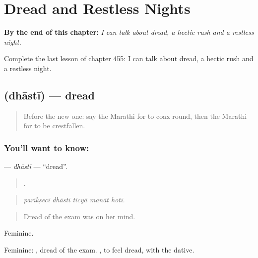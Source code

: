 
\chapter{Dread and Restless Nights}
\label{ch:mr-dread-and-restless-nights}

\begin{chapteropening}
\textbf{By the end of this chapter:} \emph{I can talk about dread, a hectic rush and a restless night.}

Complete the last lesson of chapter 455: I can talk about dread, a hectic rush and a restless night.
\end{chapteropening}

\section[\texorpdfstring{\mr{धास्ती} (dhāstī)}{धास्ती (dhāstī)}]{ (dhāstī) — dread}

\label{lesson:MR-C455-dhasti}



\begin{quote}
Before the new one: say the Marathi for to coax round, then the Marathi for to be crestfallen.
\end{quote}

\subsection*{You'll want to know: }
\textbf{} — \emph{dhāstī} — \textquotedblleft{}dread\textquotedblright{}.

\begin{quote}
    .
\end{quote}

\begin{quote}
\emph{parīkṣecī dhāstī ticyā manāt hotī.}
\end{quote}

\begin{quote}
Dread of the exam was on her mind.
\end{quote}

Feminine.

Feminine:  , dread of the exam.  , to feel dread, with the dative.


